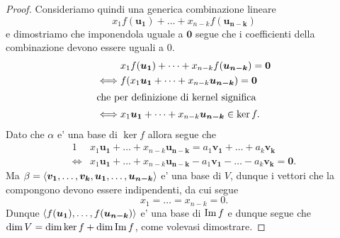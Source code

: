 \begin{proof}
    Consideriamo quindi una generica combinazione lineare \[
        x_1f(\bm{u_1}) + \dots + x_{n-k}f(\bm{u_{n-k}})
    \] e dimostriamo che imponendola uguale a $\bm 0$ segue che i coefficienti della combinazione devono essere uguali a 0.
    \begin{alignat*}
        {1}
        &x_1f(\bm{u_1}) + \dots + x_{n-k}f(\bm{u_{n-k}}) = \bm 0 \\
        \iff &f(x_1\bm{u_1} + \dots + x_{n-k}\bm{u_{n-k}}) = \bm 0 \\
        \intertext{che per definizione di kernel significa}
        \iff &x_1\bm{u_1} + \dots + x_{n-k}\bm{u_{n-k}} \in \ker f.
    \end{alignat*}
    Dato che $\alpha$ e' una base di $\ker f$ allora segue che
    \begin{alignat*}{1}
        &x_1\bm{u_1} + \dots + x_{n-k}\bm{u_{n-k}} = a_1\bm{v_1} + \dots + a_k\bm{v_k} \\
        \iff &x_1\bm{u_1} + \dots + x_{n-k}\bm{u_{n-k}} - a_1\bm{v_1} - \dots - a_k\bm{v_k} = \bm 0.
    \end{alignat*}
    Ma $\beta = \left\langle \bm{v_1}, \dots, \bm{v_k}, \bm{u_1}, \dots, \bm{u_{n-k}} \right\rangle$ e' una base di $V$, dunque i vettori che la compongono devono essere indipendenti, da cui segue \[
        x_1 = \dots = x_{n-k} = 0.   
    \]
    Dunque $\left\langle f(\bm{u_1}), \dots, f(\bm{u_{n-k}}) \right\rangle$ e' una base di $\operatorname{Im}f$ e dunque segue che $\dim V = \dim \ker f + \dim \operatorname{Im}f$, come volevasi dimostrare.
\end{proof}

